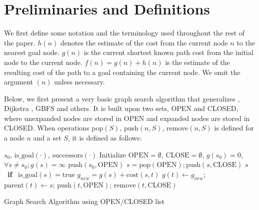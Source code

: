 \section{Preliminaries and Definitions}

\label{sec:preliminaries}

We first define some notation and the terminology used throughout the
rest of the paper.
$h(n)$ denotes the estimate of the cost from the current node $n$ to the nearest goal node.
$g(n)$ is the current shortest known path cost from the initial node to the current node.
$f(n)=g(n)+h(n)$ is the estimate of the resulting cost of the path to a goal
containing the current node.
We omit the argument $(n)$ unless necessary.

Below, we first present a very basic graph search algorithm that generalizes \astar, Dijkstra \cite{dijkstra1959note}, GBFS and others.
It is built upon two sets, OPEN and CLOSED, where unexpanded nodes are stored in OPEN and expanded nodes are stored in CLOSED. When operations pop$(S)$, push$(n,S)$, remove$(n,S)$ is defined for a node $n$ and a set $S$, it is defined as follows:

\begin{algorithm}                      
\begin{algorithmic}
 \REQUIRE $s_0$, $\text{is\_goal}(\cdot)$, $\text{successors}(\cdot)$ %
 \STATE Initialize $\text{OPEN}=\emptyset$, $\text{CLOSE}=\emptyset$, $g(s_0)=0$, $\forall s\not=s_0; g(s)=\infty$
 \STATE $\text{push}(s_0,\text{OPEN})$
 \STATE $s = \text{pop}(\text{OPEN}); \text{push}(s,\text{CLOSE})$
 \RETURN $s$ \  \textbf{if} \  $\text{is\_goal}(s)=\text{true}$
 \STATE $g_{new} = g(s) + \text{cost}(s,t)$
 \STATE $g(t) \leftarrow g_{new}$;\; $\text{parent}(t) \leftarrow s$;\; $\text{push}(t,\text{OPEN})$;\; $\text{remove}(t,\text{CLOSE})$
 \ENDIF
 \ENDFOR
 \ENDWHILE
\end{algorithmic}
\caption{Graph Search Algorithm using OPEN/CLOSED list}
\label{alg:ocl}
\end{algorithm}

